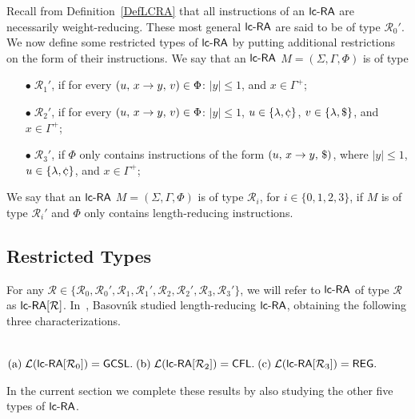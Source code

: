 Recall from Definition~\ref{DefLCRA} that all instructions of an $\lcRA$ are necessarily weight-reducing. These most general $\lcRA$ are said to be of type \index{$\lcRAp[i]$}$\mathcal{R}_0'$. We now define some restricted types of $\lcRA$ by putting additional restrictions on the form of their instructions. We say that an $\lcRA$ $M=(\Sigma,\Gamma,\Phi)$ is of type

\begin{itemize}
\item[$\bullet\;\mathcal{R}_1'$,] if for every $(u,\,x\rightarrow y,\,v) \in \Phi$: $|y|\le 1$, and $x \in \Gamma^+$;
\item[$\bullet\;\mathcal{R}_2'$,] if for every $(u,\,x\rightarrow y,\,v) \in \Phi$: $|y|\le 1$, $u \in \{\lambda,\leftsentinel\}$, $v \in \{\lambda,\$\}$, and $x \in \Gamma^+$;
\item[$\bullet\;\mathcal{R}_3'$,]  if $\Phi$ only contains instructions of the form $(u,\,x\rightarrow y,\,\$)$, where $|y|\le 1$, $u \in \{\lambda,\leftsentinel\}$, and $x \in \Gamma^+$;
\end{itemize}

We say that an $\lcRA$ $M=(\Sigma,\Gamma,\Phi)$ is of type \index{$\lcRA[i]$}$\mathcal{R}_i$, for $i \in \{0, 1, 2, 3\}$, if $M$ is of type $\mathcal{R}_i'$ and $\Phi$ only contains length-reducing instructions.

\subsection{Restricted Types}\label{section:ordinary_lcra}

For any $\mathcal{R} \in \{\mathcal{R}_0,\mathcal{R}_0',\mathcal{R}_1,\mathcal{R}_1',\mathcal{R}_2,\mathcal{R}_2',\mathcal{R}_3,\mathcal{R}_3'\}$, we will refer to $\lcRA$ of type $\mathcal{R}$ as ${\lcRA}[\mathcal{R}]$. In~\cite{B10Diploma}, Basovn{\'\i}k  studied length-reducing $\lcRA$, obtaining the following three characterizations.

\begin{theorem}{\rm \cite{B10Diploma}}\label{ThmBasovnik} \\[+0.2cm]
${\rm (a)}\;  {\mathcal L}(\lcRA[0]) = \GCSL.\;
{\rm (b)}\; {\mathcal L}(\lcRA[2]) = \CFL.\;
{\rm (c)}\; {\mathcal L}(\lcRA[3]) = \Reg.$
\end{theorem}

In the current section we complete these results by also studying the other five types of $\lcRA$.
\vspace{+0.2cm}

